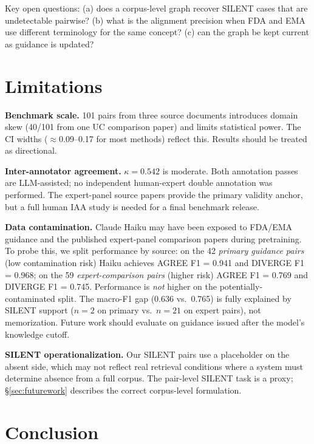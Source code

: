 \documentclass[sigconf]{acmart}
\begin{document}
Key open questions: (a) does a corpus-level graph recover SILENT cases that are
undetectable pairwise? (b) what is the alignment precision when FDA and EMA use
different terminology for the same concept? (c) can the graph be kept current
as guidance is updated?

\section{Limitations}

\textbf{Benchmark scale.} 101 pairs from three source documents introduces
domain skew (40/101 from one UC comparison paper) and limits statistical power.
The CI widths ($\approx$0.09--0.17 for most methods) reflect this. Results
should be treated as directional.

\textbf{Inter-annotator agreement.} $\kappa = 0.542$ is moderate. Both
annotation passes are LLM-assisted; no independent human-expert double
annotation was performed. The expert-panel source papers provide the primary
validity anchor, but a full human IAA study is needed for a final benchmark
release.

\textbf{Data contamination.} Claude Haiku may have been exposed to FDA/EMA
guidance and the published expert-panel comparison papers during pretraining. To
probe this, we split performance by source: on the 42 \textit{primary guidance
pairs} (low contamination risk) Haiku achieves AGREE F1 = 0.941 and DIVERGE F1
= 0.968; on the 59 \textit{expert-comparison pairs} (higher risk) AGREE F1 =
0.769 and DIVERGE F1 = 0.745. Performance is \textit{not} higher on the
potentially-contaminated split. The macro-F1 gap (0.636 vs.\ 0.765) is fully
explained by SILENT support ($n = 2$ on primary vs.\ $n = 21$ on expert
pairs), not memorization. Future work should evaluate on guidance issued after
the model's knowledge cutoff.

\textbf{SILENT operationalization.} Our SILENT pairs use a placeholder on the
absent side, which may not reflect real retrieval conditions where a system must
determine absence from a full corpus. The pair-level SILENT task is a proxy;
\S\ref{sec:futurework} describes the correct corpus-level formulation.

\section{Conclusion}
\end{document}

